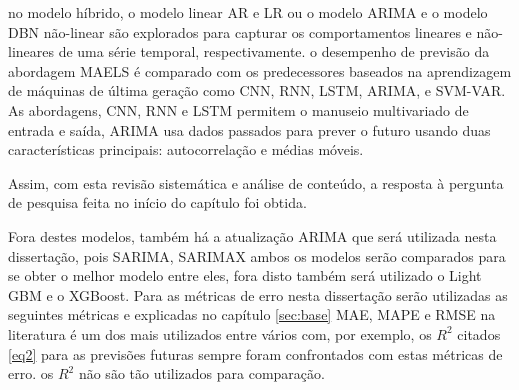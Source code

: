  no modelo híbrido, o modelo linear AR e LR ou o modelo ARIMA e o modelo DBN não-linear são explorados para capturar os comportamentos lineares e não-lineares de uma série temporal, respectivamente.  o desempenho de previsão da abordagem MAELS é comparado com os predecessores baseados na aprendizagem de máquinas de última geração como CNN, RNN, LSTM, ARIMA, e SVM-VAR. As abordagens, CNN, RNN e LSTM permitem o manuseio multivariado de entrada e saída, ARIMA usa dados passados para prever o futuro usando duas características principais: autocorrelação e médias móveis.


Assim, com esta revisão sistemática e análise de conteúdo, a resposta à pergunta de pesquisa feita no início do capítulo foi obtida.

Fora destes modelos, também há a atualização ARIMA que será utilizada nesta dissertação, pois SARIMA, SARIMAX ambos os modelos serão comparados para se obter o melhor modelo entre eles, fora disto também será utilizado o Light GBM e o XGBoost. Para as métricas de erro nesta dissertação serão utilizadas as seguintes métricas e explicadas no capítulo \ref{sec:base} MAE, MAPE e RMSE na literatura é um dos mais utilizados entre vários com, por exemplo, os $R^2$ citados \eqref{eq2} para as previsões futuras sempre foram confrontados com estas métricas de erro. os $R^2$ não são tão utilizados para comparação.
